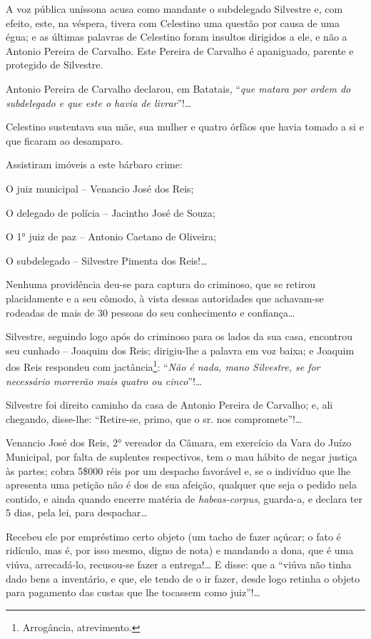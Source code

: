 A voz pública uníssona acusa como mandante o subdelegado Silvestre e,
com efeito, este, na véspera, tivera com Celestino uma questão por causa
de uma égua; e as últimas palavras de Celestino foram insultos dirigidos
a ele, e não a Antonio Pereira de Carvalho. Este Pereira de Carvalho é
apaniguado, parente e protegido de Silvestre.

Antonio Pereira de Carvalho declarou, em Batatais, ``\emph{que matara por
ordem do subdelegado e que este o havia de livrar}''!\ldots{}

Celestino sustentava sua mãe, sua mulher e quatro órfãos que havia
tomado a si e que ficaram ao desamparo.

Assistiram imóveis a este bárbaro crime:

O juiz municipal -- Venancio José dos Reis;

O delegado de polícia -- Jacintho José de Souza;

O 1° juiz de paz -- Antonio Caetano de Oliveira;

O subdelegado -- Silvestre Pimenta dos Reis!\ldots{}

Nenhuma providência deu-se para captura do criminoso, que se retirou
placidamente e a seu cômodo, à vista dessas autoridades que achavam-se
rodeadas de mais de 30 pessoas do seu conhecimento e confiança\ldots{}

Silvestre, seguindo logo após do criminoso para os lados da sua casa,
encontrou seu cunhado -- Joaquim dos Reis; dirigiu-lhe a palavra em voz
baixa; e Joaquim dos Reis respondeu com jactância\footnote{ Arrogância,
  atrevimento.}: ``\emph{Não é nada, mano Silvestre, se for necessário
morrerão mais quatro ou cinco}''!\ldots{}

Silvestre foi direito caminho da casa de Antonio Pereira de Carvalho; e,
ali chegando, disse-lhe: ``Retire-se, primo, que o sr. nos
compromete''!\ldots{}

Venancio José dos Reis, 2° vereador da Câmara, em exercício da Vara do
Juízo Municipal, por falta de suplentes respectivos, tem o mau hábito de
negar justiça às partes; cobra 5\$000 réis por um despacho favorável e,
se o indivíduo que lhe apresenta uma petição não é dos de sua afeição,
qualquer que seja o pedido nela contido, e ainda quando encerre matéria
de \emph{habeas-corpus}, guarda-a, e declara ter 5 dias, pela lei, para
despachar\ldots{}

Recebeu ele por empréstimo certo objeto (um tacho de fazer açúcar; o
fato é ridículo, mas é, por isso mesmo, digno de nota) e mandando a
dona, que é uma viúva, arrecadá-lo, recusou-se fazer a entrega!\ldots{} E
disse: que a ``viúva não tinha dado bens a inventário, e que, ele tendo
de o ir fazer, desde logo retinha o objeto para pagamento das custas que
lhe tocassem como juiz''!\ldots{}

